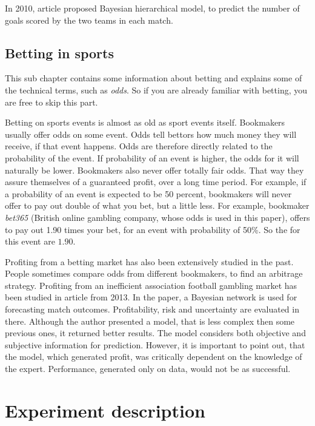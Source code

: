 \documentclass[conference]{IEEEtran}
\begin{document}
In 2010, article \cite{Baio_2010} proposed Bayesian hierarchical model, to predict the number of
goals scored by the two teams in each match.

\subsection{Betting in sports}

This sub chapter contains some information about betting and explains some of the 
technical terms, such as \textit{odds}. So if you are already familiar with betting, 
you are free to skip this part.

Betting on sports events is almost as old as sport events itself. Bookmakers usually 
offer odds on some event. Odds tell bettors how much money they will receive, if that 
event happens. Odds are therefore directly related to the probability of the event. If 
probability of an event is higher, the odds for it will naturally be lower. Bookmakers also
never offer totally fair odds. That way they assure themselves of a guaranteed profit, over 
a long time period. For example, if a probability of an event is expected to be 50 percent,
bookmakers will never offer to pay out double of what you bet, but a little less. For example,
bookmaker \textit{bet365} (British online gambling company, whose odds is used in this
paper), offers to pay out 1.90 times your bet, for an event with probability of 50\%. So the
for this event are $1.90$.

Profiting from a betting market has also been extensively studied in the past. People sometimes
compare odds from different bookmakers, to find an arbitrage strategy. Profiting from an 
inefficient association football gambling market has been studied in article 
\cite{Constantinou_2013} from 2013. In the paper, a Bayesian network is used for forecasting
match outcomes. Profitability, risk and uncertainty are evaluated in there. Although the author
presented a model, that is less complex then some previous ones, it returned better results.
The model considers both objective and subjective information for prediction.  However, it is
important to point out, that the model, which generated profit, was critically dependent on the
knowledge of the expert. Performance, generated only on data, would not be as successful.

\section{Experiment description}
\end{document}
